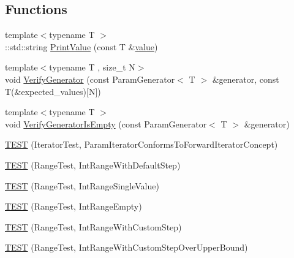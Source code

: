 \subsection*{Functions}
\begin{DoxyCompactItemize}
\item 
{\footnotesize template$<$typename T $>$ }\\\+::std\+::string \mbox{\hyperlink{googletest-master_2googletest_2test_2googletest-param-test-test_8cc_a4f874f103b3979e50bc676c7f6414dfc}{Print\+Value}} (const T \&\mbox{\hyperlink{_obj__test_2lib_2googletest-master_2googlemock_2test_2gmock-matchers__test_8cc_a337b8a670efc0b086ad3af163f3121b6}{value}})
\item 
{\footnotesize template$<$typename T , size\+\_\+t N$>$ }\\void \mbox{\hyperlink{googletest-master_2googletest_2test_2googletest-param-test-test_8cc_a11c99cfbf44746868aa44105130887f7}{Verify\+Generator}} (const Param\+Generator$<$ T $>$ \&generator, const T(\&expected\+\_\+values)\mbox{[}N\mbox{]})
\item 
{\footnotesize template$<$typename T $>$ }\\void \mbox{\hyperlink{googletest-master_2googletest_2test_2googletest-param-test-test_8cc_a85d74de6e554738555812410476b4eec}{Verify\+Generator\+Is\+Empty}} (const Param\+Generator$<$ T $>$ \&generator)
\item 
\mbox{\hyperlink{googletest-master_2googletest_2test_2googletest-param-test-test_8cc_a884488b4ac035aaa0e1f799243479538}{T\+E\+ST}} (Iterator\+Test, Param\+Iterator\+Conforms\+To\+Forward\+Iterator\+Concept)
\item 
\mbox{\hyperlink{googletest-master_2googletest_2test_2googletest-param-test-test_8cc_aa1294eff6c7aea20468f93a70e6b157d}{T\+E\+ST}} (Range\+Test, Int\+Range\+With\+Default\+Step)
\item 
\mbox{\hyperlink{googletest-master_2googletest_2test_2googletest-param-test-test_8cc_acce71b74b2d6f3c2d456e37fd62769a9}{T\+E\+ST}} (Range\+Test, Int\+Range\+Single\+Value)
\item 
\mbox{\hyperlink{googletest-master_2googletest_2test_2googletest-param-test-test_8cc_a905a71adae7909d42426aa13b7da5ede}{T\+E\+ST}} (Range\+Test, Int\+Range\+Empty)
\item 
\mbox{\hyperlink{googletest-master_2googletest_2test_2googletest-param-test-test_8cc_a806821fc992661b6da02005f57482fd8}{T\+E\+ST}} (Range\+Test, Int\+Range\+With\+Custom\+Step)
\item 
\mbox{\hyperlink{googletest-master_2googletest_2test_2googletest-param-test-test_8cc_a87b9e66f957ddc505fc81cb14fd72339}{T\+E\+ST}} (Range\+Test, Int\+Range\+With\+Custom\+Step\+Over\+Upper\+Bound)

\end{DoxyCompactItemize}
